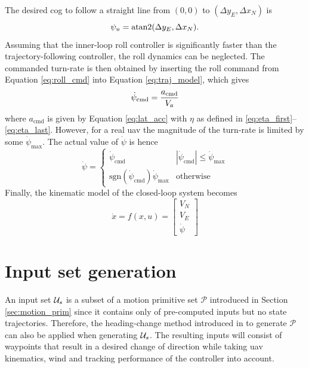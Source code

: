 The desired \ac{cog} to follow a straight line from $(0,0)$ to $(\Delta y_E, \Delta x_N)$ is
\begin{equation}
    \psi_u=\atan2(\Delta y_E,\Delta x_N).
\end{equation}
Assuming that the inner-loop roll controller is significantly faster than the trajectory-following controller, 
the roll dynamics can be neglected. The commanded turn-rate is then obtained by inserting the roll command from Equation \eqref{eq:roll_cmd} into Equation \eqref{eq:traj_model}, which gives 
\begin{equation}
    \dot{\psi}_{\text{cmd}}=\frac{a_{\text{cmd}}}{V_a}
\end{equation}
where $a_{\text{cmd}}$ is given by Equation \eqref{eq:lat_acc} with $\eta$ as defined in \eqref{eq:eta_first}--\eqref{eq:eta_last}.
However, for a real \ac{uav} the magnitude of the turn-rate is limited by some $\dot{\psi}_{\text{max}}$. The actual value of $\dot{\psi}$ is hence
\begin{equation}\label{eq:saturation}
    \dot{\psi}=\begin{cases}
        \dot{\psi}_{\text{cmd}} & |\dot{\psi}_{\text{cmd}}| \leq \dot{\psi}_{\text{max}} \\
        \text{sgn}(\dot{\psi}_{\text{cmd}})\dot{\psi}_{\text{max}} & \text{otherwise}
    \end{cases}
\end{equation}
Finally, the kinematic model of the closed-loop system becomes
\begin{equation}\label{eq:closed_loop}
    \dot{x}=f(x,u)=
    \begin{bmatrix}
        V_N\\
        V_E\\
        \dot{\psi}
    \end{bmatrix}
\end{equation}

\section{Input set generation}\label{sec:motion_prims_wind}
An input set $\mathcal{U}_s$ is a subset of a motion primitive set $\mathcal{P}$ introduced in Section \ref{sec:motion_prim} since it contains only of pre-computed inputs but no state trajectories. Therefore, 
the heading-change method introduced in \cite{Bergman_lic} to generate $\mathcal{P}$ can also be applied when generating $\mathcal{U}_s$. The resulting inputs will consist
of waypoints that result in a desired change of direction while taking \ac{uav} kinematics, wind and tracking performance of the controller into account.

